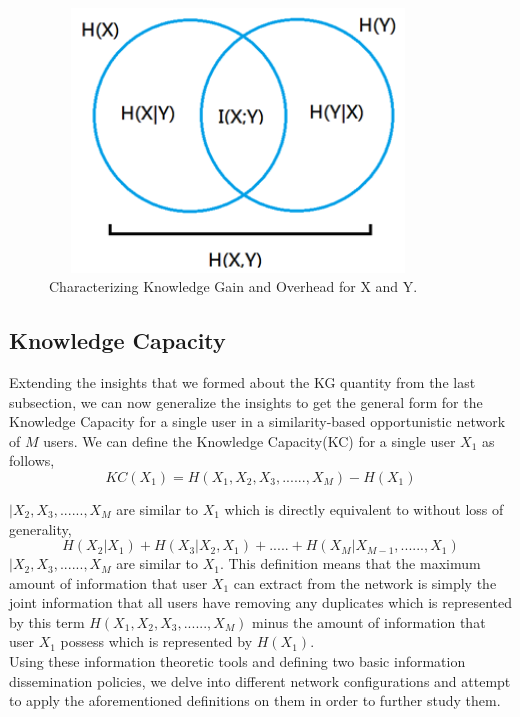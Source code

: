 \documentclass[11pt]{article}
\begin{document}
\begin{figure}[!tp]
  \centering
    \includegraphics[width=10cm ,height=7cm]{figures_png/vennSimple}
    \caption{Characterizing Knowledge Gain and Overhead for X and Y.}\label{fig:KGEncounter}
    \end{figure}
 
\subsection{Knowledge Capacity}
Extending the insights that we formed about the KG quantity from the last subsection, we can now generalize the insights to get the general form for the Knowledge Capacity for a single user in a similarity-based opportunistic network of $M$ users.
We can define the Knowledge Capacity(KC) for a single user $X_1$ as follows,
\begin{equation}
		KC(X_1) = H(X_1, X_2, X_3, ......, X_M) - H(X_1)
\end{equation}

		$ | X_2, X_3, ......, X_M$ are similar to $X_1$
which is directly equivalent to without loss of generality,
$$H(X_2|X_1) + H(X_3|X_2,X_1) + .....+ H(X_M|X_{M-1}, ......, X_1)$$
$ | X_2, X_3, ......, X_M$ are similar to $X_1$.
This definition means that the maximum amount of information that user $X_1$ can extract from the network is simply the joint information that all users have removing any duplicates which is represented by this term  $H(X_1, X_2, X_3, ......, X_M)$ minus the amount of information that user $X_1$ possess which is represented by $H(X_1)$.\\

Using these information theoretic tools and defining two basic information dissemination policies, we delve into different network configurations and attempt to apply the aforementioned definitions on them in order to further study them.
\end{document}
